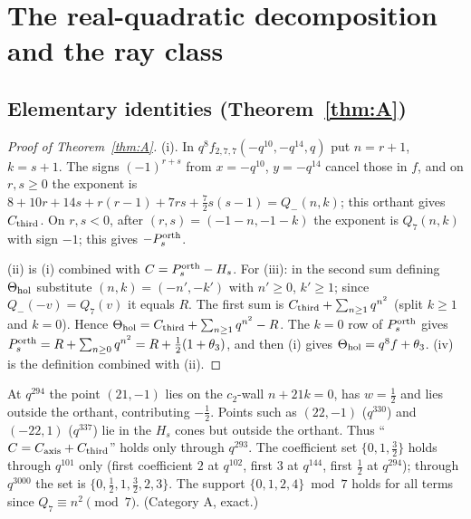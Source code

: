 \section{The real-quadratic decomposition and the ray class}\label{sec:rq}

\subsection{Elementary identities (Theorem~\ref{thm:A})}\label{sec:elem}
\begin{proof}[Proof of Theorem~\ref{thm:A}]
(i). In $q^8f_{2,7,7}(-q^{10},-q^{14},q)$ put $n=r+1$, $k=s+1$. The signs $(-1)^{r+s}$ from $x=-q^{10}$,
$y=-q^{14}$ cancel those in $f$, and on $r,s\ge0$ the exponent is
$8+10r+14s+r(r-1)+7rs+\tfrac72s(s-1)=Q_-(n,k)$; this orthant gives $C_{\mathrm{third}}$. On $r,s<0$, after
$(r,s)=(-1-n,-1-k)$ the exponent is $Q_7(n,k)$ with sign $-1$; this gives $-P^{\mathrm{orth}}_s$.

(ii) is (i) combined with $C=P^{\mathrm{orth}}_s-H_s$. For (iii): in the
second sum defining $\Theta_{\mathrm{hol}}$ substitute $(n,k)=(-n',-k')$ with $n'\ge0$, $k'\ge1$; since $Q_-(-v)=Q_7(v)$ it equals $R$.
The first sum is $C_{\mathrm{third}}+\sum_{n\ge1}q^{n^2}$ (split $k\ge1$ and $k=0$). Hence $\Theta_{\mathrm{hol}}=C_{\mathrm{third}}+\sum_{n\ge1}q^{n^2}-R$.
The $k=0$ row of $P^{\mathrm{orth}}_s$ gives $P^{\mathrm{orth}}_s=R+\sum_{n\ge0}q^{n^2}=R+\tfrac12(1+\theta_3)$, and then (i) gives
$\Theta_{\mathrm{hol}}=q^8f+\theta_3$. (iv) is the definition combined with (ii).
\end{proof}

\begin{remark}
At $q^{294}$ the point $(21,-1)$ lies on the $c_2$-wall $n+21k=0$, has $w=\tfrac12$ and lies outside the orthant,
contributing $-\tfrac12$. Points such as $(22,-1)$ ($q^{330}$) and $(-22,1)$ ($q^{337}$) lie in the $H_s$ cones but outside the
orthant. Thus ``$C=C_{\mathrm{axis}}+C_{\mathrm{third}}$'' holds only through $q^{293}$. The coefficient set $\{0,1,\tfrac32\}$ holds through $q^{101}$
only (first coefficient $2$ at $q^{102}$, first $3$ at $q^{144}$, first $\tfrac12$ at $q^{294}$); through $q^{3000}$ the set is
$\{0,\tfrac12,1,\tfrac32,2,3\}$. The support $\{0,1,2,4\}\bmod 7$ holds for all terms since $Q_7\equiv n^2\pmod7$.
(Category A, exact.)
\end{remark}

